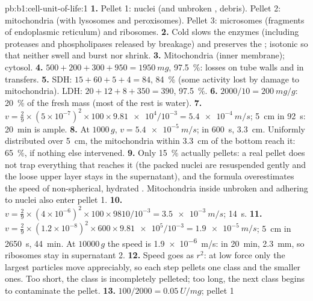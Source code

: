 \begin{solution}{pb:b1:cell-unit-of-life:1}
\textbf{1.} Pellet 1: nuclei (and unbroken , debris). Pellet 2:
mitochondria (with lysosomes and peroxisomes). Pellet 3: microsomes
(fragments of endoplasmic reticulum) and ribosomes.
\textbf{2.} Cold slows the enzymes (including proteases and
phospholipases released by breakage) and preserves the ;
isotonic so that  neither swell and burst nor shrink.
\textbf{3.} Mitochondria (inner membrane); cytosol.
\textbf{4.} $500 + 200 + 300 + 950 = \qty{1950}{mg}$, \qty{97.5}{\%}:
losses on tube walls and in transfers.
\textbf{5.} SDH: $15 + 60 + 5 + 4 = 84$, \qty{84}{\%} (some activity
lost by damage to mitochondria). LDH: $20 + 12 + 8 + 350 = 390$,
\qty{97.5}{\%}.
\textbf{6.} $2000/10 = \qty{200}{mg/g}$: \qty{20}{\%} of the fresh mass (most of the rest is water).
\textbf{7.} $v = \frac{2}{9}\times(5\times 10^{-7})^2\times 100\times
\num{9.81e4}/10^{-3} = \qty{5.4e-4}{m/s}$; \qty{5}{cm} in \qty{92}{s}:
\qty{20}{min} is ample.
\textbf{8.} At $1000\,g$, $v = \qty{5.4e-5}{m/s}$; in \qty{600}{s},
\qty{3.3}{cm}. Uniformly distributed over \qty{5}{cm}, the mitochondria
within \qty{3.3}{cm} of the bottom reach it: \qty{65}{\%}, if nothing
else intervened.
\textbf{9.} Only \qty{15}{\%} actually pellets: a real pellet does not
trap everything that reaches it (the packed nuclei are resuspended
gently and the loose upper layer stays in the supernatant), and the
formula overestimates the speed of non-spherical, hydrated .
Mitochondria inside unbroken  and adhering to nuclei also enter
pellet 1.
\textbf{10.} $v = \frac{2}{9}\times(4\times 10^{-6})^2\times 100\times
9810/10^{-3} = \qty{3.5e-3}{m/s}$; \qty{14}{s}.
\textbf{11.} $v = \frac{2}{9}\times(1.2\times 10^{-8})^2\times 600\times
\num{9.81e5}/10^{-3} = \qty{1.9e-5}{m/s}$; \qty{5}{cm} in \qty{2650}{s},
\qty{44}{min}. At $\num{10000}\,g$ the speed is \qty{1.9e-6}{m/s}: in
\qty{20}{min}, \qty{2.3}{mm}, so ribosomes stay in supernatant 2.
\textbf{12.} Speed goes as $r^2$: at low force only the largest particles
move appreciably, so each step pellets one class and  the smaller
ones. Too short, the class is incompletely pelleted; too long, the next
class begins to contaminate the pellet.
\textbf{13.}  $100/2000 = \qty{0.05}{U/mg}$; pellet 1

\end{solution}
